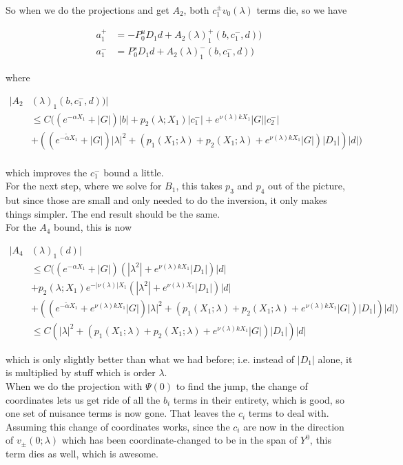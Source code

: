 \documentclass[12pt]{article}
\begin{document}
\begin{enumerate}
So when we do the projections and get $A_2$, both $c_1^\pm v_0(\lambda)$ terms die, so we have

\begin{align*}
a_1^+ &= -P^u_0 D_1 d + A_2(\lambda)_1^+(b, c_1^-, d))\\
a_1^- &=  P^s_0 D_1 d + A_2(\lambda)_1^-(b, c_1^-, d))
\end{align*}

where

\begin{align*}
|A_2&(\lambda)_1(b, c_1^-, d))| \\
&\leq C( (e^{-\alpha X_1} + |G|) |b| + p_2(\lambda; X_1) |c_1^-| + e^{\nu(\lambda)k X_1} |G||c_2^-| \\
&+ ((e^{-\tilde{\alpha} X_1} + |G|) |\lambda|^2 + (p_1(X_1; \lambda) + p_2(X_1; \lambda) + e^{\nu(\lambda)k X_1} |G|)|D_1|)|d| ) \\
\end{align*}

which improves the $c_1^-$ bound a little.\\

For the next step, where we solve for $B_1$, this takes $p_3$ and $p_4$ out of the picture, but since those are small and only needed to do the inversion, it only makes things simpler. The end result should be the same.\\

For the $A_4$ bound, this is now

\begin{align*}
|A_4&(\lambda)_1(d)| \\
&\leq C( (e^{-\alpha X_1} + |G|) (|\lambda^2| + e^{\nu(\lambda)k X_1}|D_1|)|d| \\ 
&+ p_2(\lambda; X_1) e^{-|\nu(\lambda)| X_1} (|\lambda^2| + e^{\nu(\lambda)X_1}|D_1|)|d| \\
&+ ((e^{-\tilde{\alpha} X_1} + e^{\nu(\lambda)k X_1} |G|) |\lambda|^2 + (p_1(X_1; \lambda) + p_2(X_1; \lambda) + e^{\nu(\lambda) k X_1} |G|)|D_1|)|d| )\\
&\leq C(|\lambda|^2 + (p_1(X_1; \lambda) + p_2(X_1; \lambda) + e^{\nu(\lambda) k X_1} |G|)|D_1|) |d|
\end{align*}

which is only slightly better than what we had before; i.e. instead of $|D_1|$ alone, it is multiplied by stuff which is order $\lambda$.\\

When we do the projection with $\Psi(0)$ to find the jump, the change of coordinates lets us get ride of all the $b_i$ terms in their entirety, which is good, so one set of nuisance terms is now gone. That leaves the $c_i$ terms to deal with. Assuming this change of coordinates works, since the $c_i$ are now in the direction of $v_\pm(0; \lambda)$ which has been coordinate-changed to be in the span of $Y^0$, this term dies as well, which is awesome. \\


\end{enumerate}
\end{document}

